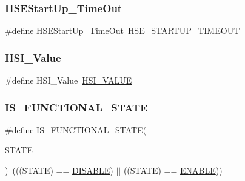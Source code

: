 \mbox{\label{group___exported__types_ga7e69dacd5c3b950b5b1786d7336b30d3}} 
\subsubsection{\texorpdfstring{HSEStartUp\_TimeOut}{HSEStartUp\_TimeOut}}
{\footnotesize\ttfamily \#define H\+S\+E\+Start\+Up\+\_\+\+Time\+Out~\mbox{\hyperlink{group___library__configuration__section_ga68ecbc9b0a1a40a1ec9d18d5e9747c4f}{H\+S\+E\+\_\+\+S\+T\+A\+R\+T\+U\+P\+\_\+\+T\+I\+M\+E\+O\+UT}}}

\mbox{\label{group___exported__types_ga5718ca1fe0825cdbebb466886cfb5016}} 
\subsubsection{\texorpdfstring{HSI\_Value}{HSI\_Value}}
{\footnotesize\ttfamily \#define H\+S\+I\+\_\+\+Value~\mbox{\hyperlink{group___library__configuration__section_gaaa8c76e274d0f6dd2cefb5d0b17fbc37}{H\+S\+I\+\_\+\+V\+A\+L\+UE}}}

\mbox{\label{group___exported__types_gaffaf7c3f537d7a3370b1bbdda67a2bf6}} 
\subsubsection{\texorpdfstring{IS\_FUNCTIONAL\_STATE}{IS\_FUNCTIONAL\_STATE}}
{\footnotesize\ttfamily \#define I\+S\+\_\+\+F\+U\+N\+C\+T\+I\+O\+N\+A\+L\+\_\+\+S\+T\+A\+TE(\begin{DoxyParamCaption}\item[{}]{S\+T\+A\+TE }\end{DoxyParamCaption})~(((S\+T\+A\+TE) == \mbox{\hyperlink{group___exported__types_ggac9a7e9a35d2513ec15c3b537aaa4fba1ad3a9df141be0ccf10389b640f492b26d}{D\+I\+S\+A\+B\+LE}}) $\vert$$\vert$ ((S\+T\+A\+TE) == \mbox{\hyperlink{group___exported__types_ggac9a7e9a35d2513ec15c3b537aaa4fba1a7d46875fa3ebd2c34d2756950eda83bf}{E\+N\+A\+B\+LE}}))}



